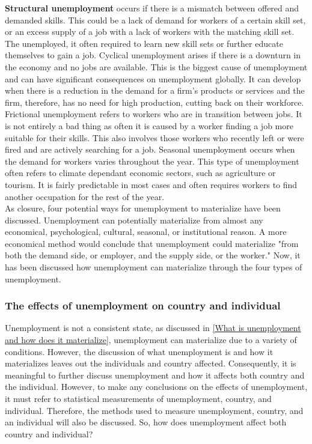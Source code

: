 \textbf{Structural unemployment} occurs if there is a mismatch between offered and demanded skills.
This could be a lack of demand for workers of a certain skill set, or an excess supply of a job with a lack of workers with the matching skill set.
The unemployed, it often required to learn new skill sets or further educate themselves to gain a job.
Cyclical unemployment arises if there is a downturn in the economy and no jobs are available.
This is the biggest cause of unemployment and can have significant consequences on unemployment globally. \cite{Understanding_four_types_of_unemployment}
It can develop when there is a reduction in the demand for a firm's products or services and the firm, therefore, has no need for high production, cutting back on their workforce. 
Frictional unemployment refers to workers who are in transition between jobs. 
It is not entirely a bad thing as often it is caused by a worker finding a job more suitable for their skills.
This also involves those workers who recently left or were fired and are actively searching for a job.
Seasonal unemployment occurs when the demand for workers varies throughout the year.
This type of unemployment often refers to climate dependant economic sectors, such as agriculture or tourism.
It is fairly predictable in most cases and often requires workers to find another occupation for the rest of the year. \\

As closure, four potential ways for unemployment to materialize have been discussed.
Unemployment can potentially materialize from almost any economical, psychological, cultural, seasonal, or institutional reason. 
A more economical method would conclude that unemployment could materialize "from both the demand side, or employer, and the supply side, or the worker." \cite{Economical_theory_behind_unemployment}
Now, it has been discussed how unemployment can materialize through the four types of unemployment. \cite{Guide_to_unemployment} \\

\subsubsection{The effects of unemployment on country and individual} \label{The effects of unemployment on country and individual}
Unemployment is not a consistent state, as discussed in \ref{What is unemployment and how does it materialize}, unemployment can materialize due to a variety of conditions.
However, the discussion of what unemployment is and how it materializes leaves out the individuals and country affected.
Consequently, it is meaningful to further discuss unemployment and how it affects both country and the individual.
However, to make any conclusions on the effects of unemployment, it must refer to statistical measurements of unemployment, country, and individual. 
Therefore, the methods used to measure unemployment, country, and an individual will also be discussed.
So, how does unemployment affect both country and individual? \\

